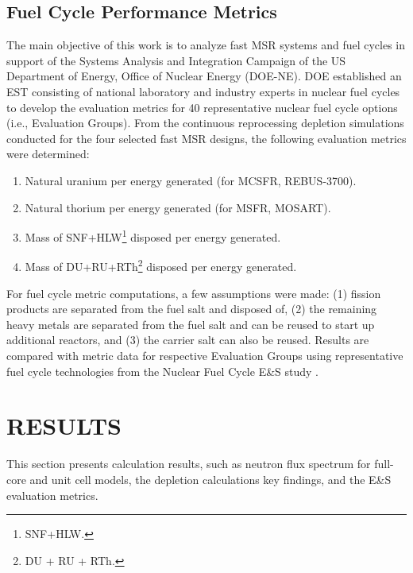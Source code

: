 \documentclass[letterpaper]{mandc2019}
\begin{document}
\subsection{Fuel Cycle Performance Metrics}
\label{sec:metrics}
The main objective of this work is to analyze fast \gls{MSR} systems and fuel cycles in support of the Systems Analysis and Integration Campaign of the US Department of Energy, Office of Nuclear Energy (DOE-NE). 
DOE established an \gls{EST} consisting of national laboratory and industry experts in nuclear fuel cycles to develop the evaluation metrics for 40 representative nuclear fuel cycle options (i.e., Evaluation Groups). 
From the continuous reprocessing depletion simulations conducted for the four selected fast \gls{MSR} designs, the following evaluation metrics were determined:
\vspace{-0.25in}
\begin{enumerate}
	\item Natural uranium per energy generated (for \gls{MCSFR}, REBUS-3700).\vspace{-0.11in}
	\item Natural thorium per energy generated (for \gls{MSFR}, \gls{MOSART}).\vspace{-0.11in}
	\item Mass of SNF+HLW\footnote{\gls{SNF}+\gls{HLW}.} disposed per energy generated.\vspace{-0.11in}
	\item Mass of DU+RU+RTh\footnote{\gls{DU} + \gls{RU} + \gls{RTh}.} disposed per energy  generated.\vspace{-0.18in}
\end{enumerate}
For fuel cycle metric computations, a few assumptions were made:
(1) fission products are separated from the fuel salt and disposed of,
(2) the remaining heavy metals are separated from the fuel salt and can be reused to start up additional reactors, and
(3) the carrier salt can also be reused.
Results are compared with metric data for respective Evaluation Groups using representative fuel cycle technologies from the Nuclear Fuel Cycle E\&S study \cite{wigeland_nuclear_2014-4}.
\section{RESULTS}
This section presents calculation results, such as neutron flux spectrum for full-core and unit cell models, the depletion calculations key findings, and the E\&S evaluation metrics.
\end{document}
